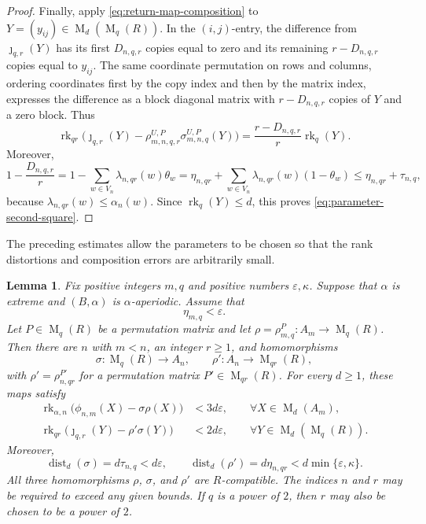 \documentclass[11pt]{amsart}
\DeclareMathOperator{\rk}{rk}
\DeclareMathOperator{\Mat}{M}
\newtheorem{lemma}[theorem]{Lemma}
\theoremstyle{definition}
\theoremstyle{remark}
\begin{document}
\begin{proof}
Finally, apply \eqref{eq:return-map-composition} to
$Y=(y_{ij})\in\Mat_d(\Mat_q(R))$.
In the $(i,j)$-entry, the difference from $\jmath_{q,r}(Y)$ has its first $D_{n,q,r}$ copies equal to zero and
its remaining $r-D_{n,q,r}$ copies equal to $y_{ij}$.
The same coordinate permutation on rows and columns, ordering coordinates
first by the copy index and then by the matrix index, expresses the
difference as a block diagonal matrix with $r-D_{n,q,r}$ copies of $Y$ and a zero block.
Thus
\[
\rk_{qr}\bigl(
   \jmath_{q,r}(Y)-
   \rho_{m,n,q,r}^{U,P}\sigma_{m,n,q}^{U,P}(Y)
 \bigr)
 =\frac{r-D_{n,q,r}}r\rk_q(Y).
\]
Moreover,
\[
1-\frac{D_{n,q,r}}r
 =1-\sum_{w\in V_n}\lambda_{n,qr}(w)\theta_w
 =\eta_{n,qr}
   +\sum_{w\in V_n}\lambda_{n,qr}(w)(1-\theta_w)
 \leq\eta_{n,qr}+\tau_{n,q},
\]
because $\lambda_{n,qr}(w)\leq\alpha_n(w)$.
Since $\rk_q(Y)\leq d$, this proves
\eqref{eq:parameter-second-square}.
\end{proof}

The preceding estimates allow the parameters to be chosen so that
the rank distortions and composition errors are arbitrarily small.

\begin{lemma}\label{lem:finite-approximation}
Fix positive integers $m,q$ and positive numbers $\varepsilon,\kappa$.
Suppose that $\alpha$ is extreme and $(B,\alpha)$ is $\alpha$-aperiodic.
Assume that
\begin{equation}\label{eq:input-floor-error}
 \eta_{m,q}<\varepsilon.
\end{equation}
Let $P\in\Mat_q(R)$ be a permutation matrix and let
$\rho=\rho_{m,q}^{P}\colon A_m\to\Mat_q(R)$.
Then there are $n$ with $m<n$, an integer $r\geq1$, and homomorphisms
\[
  \sigma\colon \Mat_q(R)\longrightarrow A_n,
  \qquad
  \rho'\colon A_n\longrightarrow \Mat_{qr}(R),
\]
with $\rho'=\rho_{n,qr}^{P'}$ for a permutation matrix
$P'\in\Mat_{qr}(R)$.
For every $d\geq1$, these maps satisfy
\begin{align}
 \rk_{\alpha,n}\bigl(\phi_{n,m}(X)-\sigma\rho(X)\bigr)
 &<3d\varepsilon,\qquad \forall X\in\Mat_d(A_m),
 \label{eq:first-square}\\
 \rk_{qr}\bigl(\jmath_{q,r}(Y)-\rho'\sigma(Y)\bigr)
 &<2d\varepsilon,\qquad \forall Y\in\Mat_d(\Mat_q(R)).
 \label{eq:second-square}
\end{align}
Moreover,
\begin{equation}\label{eq:finite-approximation-distortions}
 \operatorname{dist}_d(\sigma)=d\tau_{n,q}<d\varepsilon,
 \qquad
 \operatorname{dist}_d(\rho')=d\eta_{n,qr}
 <d\min\{\varepsilon,\kappa\}.
\end{equation}
All three homomorphisms $\rho$, $\sigma$, and $\rho'$ are $R$-compatible.
The indices $n$ and $r$ may be required to exceed any given bounds.
If $q$ is a power of $2$, then $r$ may also be chosen to be a power of $2$.
\end{lemma}
\end{document}
